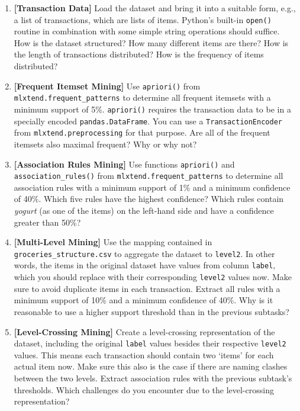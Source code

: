 \documentclass[12pt]{article}
\newcommand{\code}[1]{\textcolor{kitgreen}{\texttt{#1}}}
\newcommand{\taskname}[1]{\textcolor{kitblue}{\textbf{[#1]}}}
\begin{document}
\begin{enumerate}[label=\alph*), left=0pt, itemsep=12pt]
	\item
	\taskname{Transaction Data}
	Load the dataset and bring it into a suitable form, e.g., a list of transactions, which are lists of items.
	Python's built-in \code{open()} routine in combination with some simple string operations should suffice.
	\newline
	How is the dataset structured?
	How many different items are there?
	How is the length of transactions distributed?
	How is the frequency of items distributed?
	\item
	\taskname{Frequent Itemset Mining}
	Use \code{apriori()} from \code{mlxtend.frequent\_patterns} to determine all frequent itemsets with a minimum support of 5\%.
	\code{apriori()} requires the transaction data to be in a specially encoded \code{pandas.DataFrame}.
	You can use a \code{TransactionEncoder} from \code{mlxtend.preprocessing} for that purpose.
	\newline
	Are all of the frequent itemsets also maximal frequent?
	Why or why not?
	\item
	\taskname{Association Rules Mining}
	Use functions \code{apriori()} and \code{association\_rules()} from \code{mlxtend.frequent\_patterns} to determine all association rules with a minimum support of 1\% and a minimum confidence of 40\%.
	\newline
	Which five rules have the highest confidence?
	Which rules contain \textit{yogurt} (as one of the items) on the left-hand side and have a confidence greater than 50\%?
	\item
	\taskname{Multi-Level Mining}
	Use the mapping contained in \code{groceries\_structure.csv} to aggregate the dataset to \code{level2}.
	In other words, the items in the original dataset have values from column \code{label}, which you should replace with their corresponding \code{level2} values now.
	Make sure to avoid duplicate items in each transaction.
	Extract all rules with a minimum support of 10\% and a minimum confidence of 40\%.
	\newline
	Why is it reasonable to use a higher support threshold than in the previous subtasks?
	\item
	\taskname{Level-Crossing Mining}
	Create a level-crossing representation of the dataset, including the original \code{label} values besides their respective \code{level2} values.
	This means each transaction should contain two `items' for each actual item now.
	Make sure this also is the case if there are naming clashes between the two levels.
	Extract association rules with the previous subtask's thresholds.
	\newline
	Which challenges do you encounter due to the level-crossing representation?
\end{enumerate}
\end{document}
